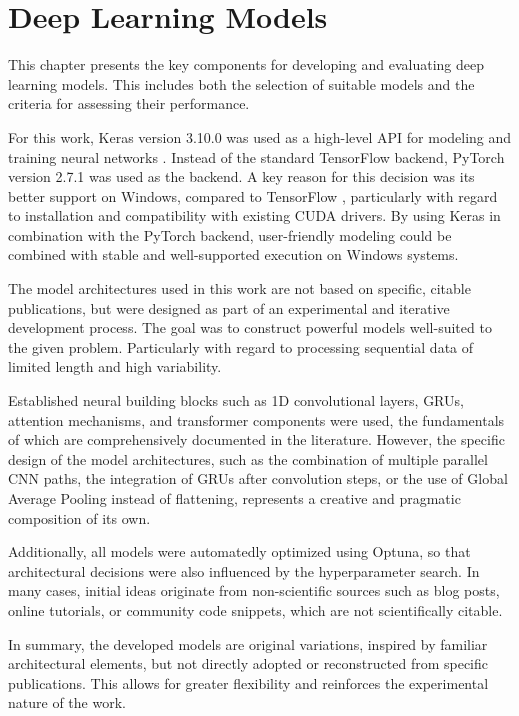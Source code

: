 \section{Deep Learning Models}
\label{chap:dl-models}

This chapter presents the key components for developing and evaluating deep learning models.
This includes both the selection of suitable models and the criteria for assessing their performance.

For this work, Keras version 3.10.0 was used as a high-level API for modeling and training neural networks \cite{keras-home}.
Instead of the standard TensorFlow backend, PyTorch version 2.7.1 was used as the backend.
A key reason for this decision was its better support on Windows, compared to TensorFlow \cite{tf-windows}, particularly with regard to installation and compatibility with existing CUDA drivers.
By using Keras in combination with the PyTorch backend, user-friendly modeling could be combined with stable and well-supported execution on Windows systems.

The model architectures used in this work are not based on specific, citable publications, but were designed as part of an experimental and iterative development process.
The goal was to construct powerful models well-suited to the given problem.
Particularly with regard to processing sequential data of limited length and high variability.

Established neural building blocks such as 1D convolutional layers, GRUs, attention mechanisms, and transformer components were used, the fundamentals of which are comprehensively documented in the literature.
However, the specific design of the model architectures, such as the combination of multiple parallel CNN paths, the integration of GRUs after convolution steps, or the use of Global Average Pooling instead of flattening, represents a creative and pragmatic composition of its own.

Additionally, all models were automatedly optimized using Optuna, so that architectural decisions were also influenced by the hyperparameter search.
In many cases, initial ideas originate from non-scientific sources such as blog posts, online tutorials, or community code snippets, which are not scientifically citable.

In summary, the developed models are original variations, inspired by familiar architectural elements, but not directly adopted or reconstructed from specific publications.
This allows for greater flexibility and reinforces the experimental nature of the work.

